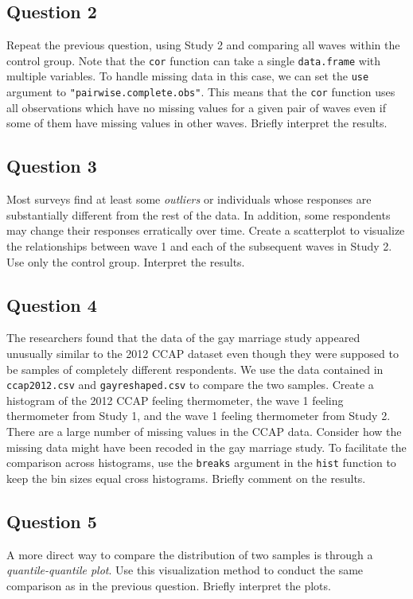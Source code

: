 \documentclass[]{article}
\begin{document}
\subsection{Question 2}\label{question-2}

Repeat the previous question, using Study 2 and comparing all waves
within the control group. Note that the \texttt{cor} function can take a
single \texttt{data.frame} with multiple variables. To handle missing
data in this case, we can set the \texttt{use} argument to
\texttt{"pairwise.complete.obs"}. This means that the \texttt{cor}
function uses all observations which have no missing values for a given
pair of waves even if some of them have missing values in other waves.
Briefly interpret the results.

\subsection{Question 3}\label{question-3}

Most surveys find at least some \emph{outliers} or individuals whose
responses are substantially different from the rest of the data. In
addition, some respondents may change their responses erratically over
time. Create a scatterplot to visualize the relationships between wave 1
and each of the subsequent waves in Study 2. Use only the control group.
Interpret the results.

\subsection{Question 4}\label{question-4}

The researchers found that the data of the gay marriage study appeared
unusually similar to the 2012 CCAP dataset even though they were
supposed to be samples of completely different respondents. We use the
data contained in \texttt{ccap2012.csv} and \texttt{gayreshaped.csv} to
compare the two samples. Create a histogram of the 2012 CCAP feeling
thermometer, the wave 1 feeling thermometer from Study 1, and the wave 1
feeling thermometer from Study 2. There are a large number of missing
values in the CCAP data. Consider how the missing data might have been
recoded in the gay marriage study. To facilitate the comparison across
histograms, use the \texttt{breaks} argument in the \texttt{hist}
function to keep the bin sizes equal cross histograms. Briefly comment
on the results.

\subsection{Question 5}\label{question-5}

A more direct way to compare the distribution of two samples is through
a \emph{quantile-quantile plot}. Use this visualization method to
conduct the same comparison as in the previous question. Briefly
interpret the plots.
\end{document}
